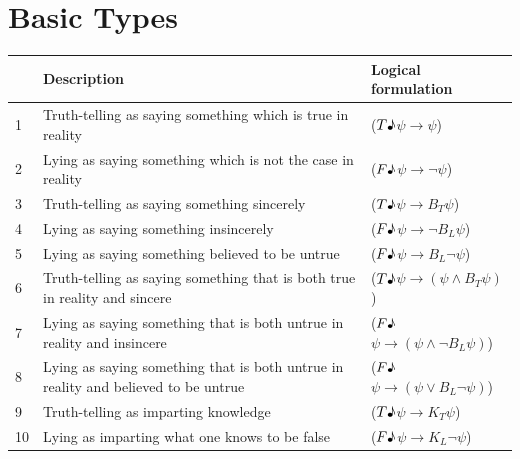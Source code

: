 \documentclass[12pt, titlepage, twoside, a4paper]{report}
\newcommand{\true}{$T\text{\textmusicalnote}$}
\newcommand{\false}{$F\text{\textmusicalnote}$}
\begin{document}
\chapter{Basic Types}
\begin{table}[h]
\begin{tabular}{lp{9cm}l}
\hline
   & Description                                                                        & Logical formulation                               \\ \hline
1  & Truth-telling as saying something which is true in reality                         & (\true$\psi \to \psi$)                            \\
2  & Lying as saying something which is not the case in reality                         & (\false$\psi \to \neg \psi$)                      \\ \hline
3  & Truth-telling as saying something sincerely                                        & (\true$\psi \to B_T \psi$)                     \\
4  & Lying as saying something insincerely                                              & (\false$\psi \to \neg B_L \psi$)               \\
5  & Lying as saying something believed to be untrue                                    & (\false$\psi \to  B_L \neg \psi$)              \\ \hline
6  & Truth-telling as saying something that is both true in reality and sincere         & (\true$\psi \to (\psi \wedge B_T \psi)$)       \\
7  & Lying as saying something that is both untrue in reality and insincere             & (\false$\psi \to (\psi \wedge \neg B_L \psi)$) \\
8  & Lying as saying something that is both untrue in reality and believed to be untrue & (\false$\psi \to (\psi \vee B_L \neg \psi)$)   \\ \hline
9  & Truth-telling as imparting knowledge                                               & (\true$\psi \to K_T \psi$)                     \\
10 & Lying as imparting what one knows to be false                                      & (\false$\psi \to K_L \neg \psi$)               \\ \hline
\end{tabular}
\end{table}
\end{document}
